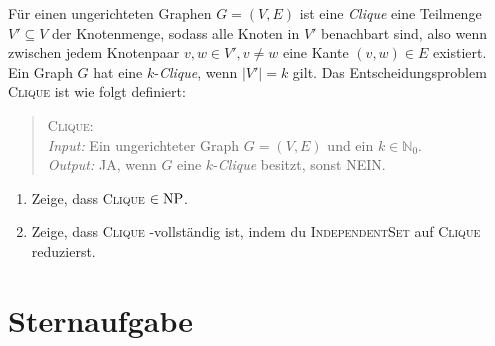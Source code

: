 \documentclass{uebung_cs}
\begin{document}
\begin{aufgabe}[Clique]
	Für einen ungerichteten Graphen $G = (V,E)$  ist eine \textit{Clique} eine Teilmenge $V' \subseteq V$ der Knotenmenge, sodass alle Knoten in $V'$ benachbart sind, also wenn zwischen jedem Knotenpaar $v,w \in V', v \neq w$ eine Kante $(v,w) \in E$ existiert. Ein Graph $G$ hat eine $k$-\textit{Clique}, wenn $|V'| = k$ gilt. Das Entscheidungsproblem \textsc{Clique} ist wie folgt definiert:
	\begin{quote}
		\textsc{Clique}:\\
		\textit{Input:} Ein ungerichteter Graph $G = (V,E)$ und ein $k \in \mathbb{N}_0$.\\
		\textit{Output:} \glqq JA\grqq{}, wenn $G$ eine $k$-\textit{Clique} besitzt, sonst \glqq NEIN\grqq{}.
	\end{quote}
	\begin{enumerate}
		\item Zeige, dass \textsc{Clique} $\in \mathrm{NP}$.
		\item Zeige, dass \textsc{Clique} \NP-vollständig ist, indem du \textsc{IndependentSet} auf \textsc{Clique} reduzierst.
	\end{enumerate}
\end{aufgabe}

\section*{Sternaufgabe}

\begin{aufgabe}
	
\end{aufgabe}
\end{document}

